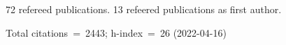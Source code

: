 72 refereed publications. 13 refeered publications as first author.

Total citations~=~2443; h-index~=~26 (2022-04-16)